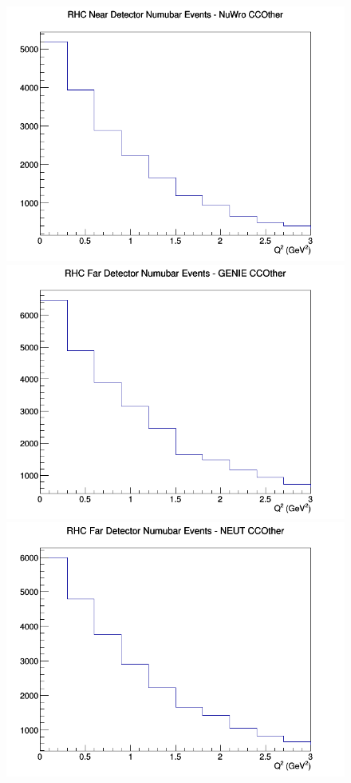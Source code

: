 \documentclass[12pt]{article}
\begin{document}
\begin{figure}[h]
\includegraphics[width=\linewidth]{eff_Q2/FGT/CCOther_RHC_ND_numubar_Q2_NuWro.png}
\endminipage
\newline
{}
\includegraphics[width=\linewidth]{eff_Q2/FGT/CCOther_RHC_FD_numubar_Q2_GENIE.png}
\endminipage
{}
\includegraphics[width=\linewidth]{eff_Q2/FGT/CCOther_RHC_FD_numubar_Q2_NEUT.png}

\end{figure}
\end{document}

